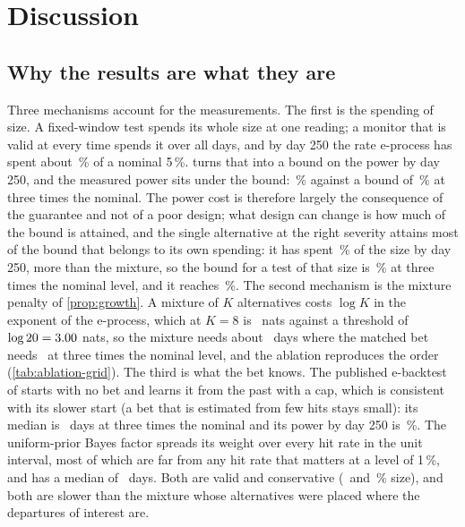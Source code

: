 \section{Discussion}
\label{sec:discussion}

\subsection{Why the results are what they are}
\label{sec:discussion-why}

Three mechanisms account for the measurements. The first is the spending of size. A fixed-window test spends its whole size at one reading; a monitor that is valid at every time spends it over all days, and by day 250 the rate e-process has spent about \nExactESize\,\% of a nominal 5\,\%.  turns that into a bound on the power by day 250, and the measured power sits under the bound: \nByThreeE\,\% against a bound of \nExactThreeNpE\,\% at three times the nominal.
The power cost is therefore largely the consequence of the guarantee and not of a poor design; what design can change is how much of the bound is attained, and the single alternative at the right severity attains most of the bound that belongs to its own spending: it has spent \nExactSingleThreeSize\,\% of the size by day 250, more than the mixture, so the bound for a test of that size is \nExactSingleThreeNp\,\% at three times the nominal level, and it reaches \nAbByThreeSingleThree\,\%. The second mechanism is the mixture penalty of \cref{prop:growth}. A mixture of $K$ alternatives costs $\log K$ in the exponent of the e-process, which at $K=8$ is \nLogEight\ nats against a threshold of $\log 20=3.00$ nats,
so the mixture needs about \nKlMixThree\ days where the matched bet needs \nKlSprtThree\ at three times the nominal level, and the ablation reproduces the order (\cref{tab:ablation-grid}). The third is what the bet knows. The published e-backtest of \citet{wang2022} starts with no bet and learns it from the past with a cap, which is consistent with its slower start (a bet that is estimated from few hits stays small): its median is \nMedThreeWwz\ days at three times the nominal and its power by day 250 is \nByThreeWwz\,\%. The uniform-prior Bayes factor spreads its weight over every hit rate in the unit interval, most of which are far from any hit rate that matters at a level of 1\,\%, and has a median of \nMedThreeBeta\ days.
Both are valid and conservative (\nNullSizeWwz\ and \nNullSizeBeta\,\% size), and both are slower than the mixture whose alternatives were placed where the departures of interest are.

